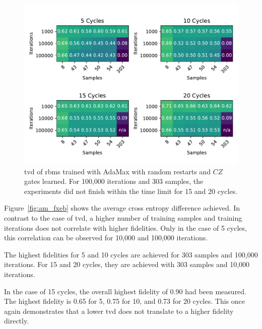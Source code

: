 \begin{figure}[H]
  \centering
  \includegraphics[width=\textwidth]{figures/results/AM-restarts-learned/tvd_heatmap.pdf}
  \caption[TVD of RBMs Trained with AdaMax with Random Restarts and $CZ$ Gates Learned]{
  \gls{tvd} of \gls{rbm}s trained with AdaMax with random restarts and $CZ$ gates learned.
  For 100,000 iterations and 303 samples, the experiments did not finish within the time limit for 15 and 20 cycles.}
  \label{fig:am_tvd}
\end{figure}

Figure~\ref{fig:am_fxeb} shows the average cross entropy difference achieved. In contrast to the case 
of \gls{tvd}, a higher number of training samples and training iterations does not correlate with higher 
fidelities. Only in the case of 5 cycles, this correlation can be observed for 10,000 and 100,000 iterations.

The highest fidelities for 5 and 10 cycles are achieved for 303 samples and 100,000 iterations. For 
15 and 20 cycles, they are achieved with 303 samples and 10,000 iterations. 

In the case of 15 cycles, the overall highest fidelity of 0.90 had been measured. The highest fidelity is 0.65 for 5, 0.75 for 10, and 0.73 for 20 cycles.
This once again demonstrates that a lower \gls{tvd} does not translate to a higher fidelity directly.

